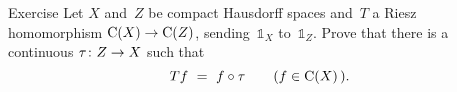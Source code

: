 \documentclass[main.tex]{subfiles}
\begin{document}
%
%
\begin{psec}{7.15}{Exercise}
Let $X$ and~$Z$ be compact Hausdorff spaces
and~$T$ a Riesz homomorphism $\mathrm{C}(X)\rightarrow\mathrm{C}(Z)$,
sending~$\mathbb{1}_X$ to~$\mathbb{1}_Z$.
Prove that there is a continuous $\tau\colon Z\rightarrow X$
such that
\begin{equation*}
Tf\ =\ f\circ\tau\qquad (f\in\Cont{X}\,)\htam{.}
\end{equation*}
\end{psec}
%
%
%
\clearpage
\end{document}

